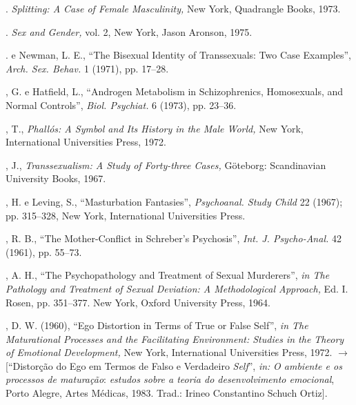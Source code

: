 \begin{description}
. \textit{Splitting: A Case of Female Masculinity, } New York,
Quadrangle Books, 1973.

. \textit{Sex and Gender, }vol. 2, New York, Jason Aronson,
1975.

. e Newman, L. E., ``The Bisexual Identity of
Transsexuals: Two Case Examples'', \textit{Arch. Sex. Behav. }1
(1971), pp. 17--28.

, G. e Hatfield, L., ``Androgen Metabolism in
Schizophrenics, Homosexuals, and Normal Controls'', \textit{Biol.
Psychiat. }6 (1973), pp. 23--36.

, T., \textit{Phallós: A Symbol and Its History in the Male World,
}New York, International Universities Press, 1972.

, J., \textit{Transsexualism: A Study of Forty-three Cases, }Göteborg:
Scandinavian University Books, 1967.

, H. e Leving, S., ``Masturbation Fantasies'',
\textit{Psychoanal. Study Child }22 (1967); pp. 315--328, New York, International
Universities Press.

, R. B., ``The Mother-Conflict in
Schreber's Psychosis'', \textit{Int. J. Psycho-Anal.
} 42 (1961), pp. 55--73.

, A. H., ``The Psychopathology and Treatment of Sexual
Murderers'', \textit{in The Pathology and Treatment of Sexual
Deviation: A Methodological Approach, }Ed. I. Rosen, pp. 351--377. New York, Oxford
University Press, 1964.

, D. W. (1960), ``Ego Distortion in Terms of True or
False Self'', \textit{in The Maturational Processes and the
Facilitating Environment: Studies in the Theory of Emotional Development, }New
York, International Universities Press, 1972. {$\bm{\rightarrow}$} [“Distorção do Ego em Termos de
Falso e Verdadeiro \textit{Self}”, \textit{in: } \textit{O ambiente e os processos
de maturação}: \textit{estudos sobre a teoria do desenvolvimento emocional}, Porto
Alegre, Artes Médicas, 1983. Trad.: Irineo Constantino Schuch Ortiz].

\end{description}

\cleardoublepage


